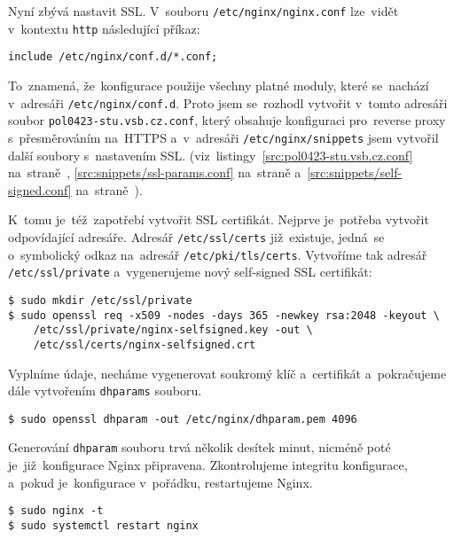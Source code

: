 Nyní zbývá nastavit SSL. V~souboru \texttt{/etc/nginx/nginx.conf}
lze~vidět v~kontextu \texttt{http} následující příkaz:

\begin{verbatim}
include /etc/nginx/conf.d/*.conf;
\end{verbatim}

To~znamená, že~konfigurace použije všechny platné moduly, které se~nachází
v~adresáři \texttt{/etc/nginx/conf.d}. Proto jsem se~rozhodl vytvořit
v~tomto adresáři soubor \texttt{pol0423-stu.vsb.cz.conf}, který obsahuje
konfiguraci pro~reverse proxy s~přesměrováním na~HTTPS
a~v~adresáři \texttt{/etc/nginx/snippets} jsem vytvořil další
soubory s~nastavením SSL. (viz~listingy~\ref{src:pol0423-stu.vsb.cz.conf}
na~straně~\pageref{src:pol0423-stu.vsb.cz.conf},
\ref{src:snippets/ssl-params.conf} na~straně
\pageref{src:snippets/ssl-params.conf} a~\ref{src:snippets/self-signed.conf}
na~straně~\pageref{src:snippets/self-signed.conf}).

K~tomu je~též~zapotřebí vytvořit SSL certifikát. Nejprve je~potřeba vytvořit
odpovídající adresáře. Adresář \texttt{/etc/ssl/certs} již~existuje, jedná~se
o~symbolický odkaz na~adresář \texttt{/etc/pki/tls/certs}.
Vytvoříme tak adresář \texttt{/etc/ssl/private} a~vygenerujeme nový
self-signed SSL certifikát:

\begin{verbatim}
$ sudo mkdir /etc/ssl/private
$ sudo openssl req -x509 -nodes -days 365 -newkey rsa:2048 -keyout \
    /etc/ssl/private/nginx-selfsigned.key -out \
    /etc/ssl/certs/nginx-selfsigned.crt
\end{verbatim}

Vyplníme údaje, necháme vygenerovat soukromý klíč a~certifikát a~pokračujeme
dále vytvořením \texttt{dhparams} souboru.



\begin{verbatim}
$ sudo openssl dhparam -out /etc/nginx/dhparam.pem 4096
\end{verbatim}

Generování \texttt{dhparam} souboru trvá několik desítek minut, nicméně
poté je~již~konfigurace Nginx připravena. Zkontrolujeme integritu
konfigurace, a~pokud je~konfigurace v~pořádku, restartujeme Nginx.

\begin{verbatim}
$ sudo nginx -t
$ sudo systemctl restart nginx
\end{verbatim}

